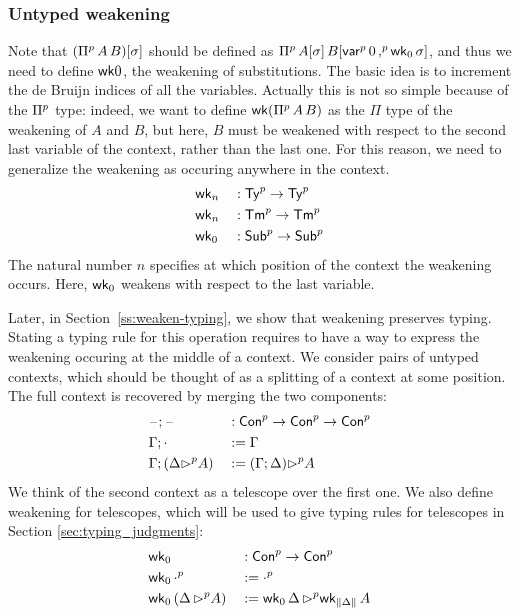 \subsubsection{Untyped weakening}




Note that $({\Pi}^p \,A\,B)[\sigma]$ should be defined as ${\Pi}^p
\,A[\sigma]\,B[{\mathsf{var}}^p\, 0 \,{,}^p\, \mathsf{wk}_0\,\sigma]$, and thus we need to define
$\mathsf{wk}0$, the weakening of substitutions.  The basic idea is to increment the de
Bruijn indices of all the variables.  Actually this is not so simple because of
the ${\Pi}^p$ type: indeed, we want to define $\mathsf{wk}({\Pi}^p\,A\,B)$ as the $\Pi$ type
of the weakening of $A$ and $B$, but here, $B$ must be weakened with respect to
the second last variable of the context, rather than the last one.  For this
reason, we need to generalize the weakening as occuring anywhere in the context.
\begin{alignat*}{5}
  & \mathsf{wk}_n && :  {\mathsf{Ty}}^p\rightarrow{\mathsf{Ty}}^p \\
  & \mathsf{wk}_n && :  {\mathsf{Tm}}^p\rightarrow{\mathsf{Tm}}^p \\
  & \mathsf{wk}_0 && : {\mathsf{Sub}}^p\rightarrow {\mathsf{Sub}}^p
  \end{alignat*}
  The natural number $n$ specifies at which position of the context the
  weakening occurs.
  Here, $\mathsf{wk}_0$ weakens with respect to the last variable.

Later, in Section~\ref{ss:weaken-typing}, we show that weakening preserves
typing. Stating a typing rule for this operation requires to have a way to
express the weakening occuring at the middle of a context. We consider pairs of
untyped contexts, which should be thought of as a splitting of a context at some
position. The full context is recovered by merging the two components:
\begin{alignat*}{5}
  & \mathord{\hspace{1pt}\text{--}\hspace{1pt}} ; \mathord{\hspace{1pt}\text{--}\hspace{1pt}} && :  {\mathsf{Con}}^p\rightarrow{\mathsf{Con}}^p\rightarrow{\mathsf{Con}}^p \\
  & \Gamma ; \cdot && :=  \Gamma \\
  & \Gamma ; (\Delta {\rhd}^p A) && :=  (\Gamma ; \Delta){\rhd}^p A
\end{alignat*}
We think of the second context as a telescope over the first one. We also define
weakening for telescopes, which will be used to give typing rules for telescopes
in Section \ref{sec:typing_judgments}:
\begin{alignat*}{5}
  & \mathsf{wk}_0 && : {\mathsf{Con}}^p\rightarrow {\mathsf{Con}}^p
  \\
  & \mathsf{wk}_0\,{\cdot}^p && := {\cdot}^p
  \\
  & \mathsf{wk}_0\,(\Delta\,{\rhd}^p A) && := \mathsf{wk}_0\,\Delta\,{\rhd}^p \mathsf{wk}_{\| \Delta \|}\,A
  \end{alignat*}
